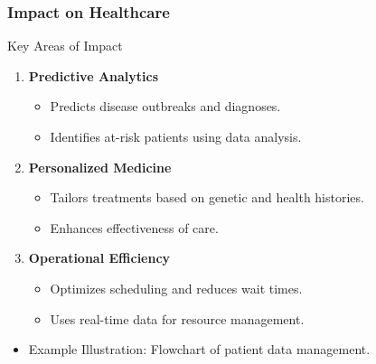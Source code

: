 \documentclass[aspectratio=169]{beamer}
\begin{document}
\begin{frame}[fragile]
    \frametitle{Impact on Healthcare}
    \begin{block}{Key Areas of Impact}
        \begin{enumerate}
            \item \textbf{Predictive Analytics}
            \begin{itemize}
                \item Predicts disease outbreaks and diagnoses.
                \item Identifies at-risk patients using data analysis.
            \end{itemize}
            \item \textbf{Personalized Medicine}
            \begin{itemize}
                \item Tailors treatments based on genetic and health histories.
                \item Enhances effectiveness of care.
            \end{itemize}
            \item \textbf{Operational Efficiency}
            \begin{itemize}
                \item Optimizes scheduling and reduces wait times.
                \item Uses real-time data for resource management.
            \end{itemize}
        \end{enumerate}
    \end{block}
    \begin{itemize}
        \item Example Illustration: Flowchart of patient data management.
    \end{itemize}
\end{frame}
\end{document}
